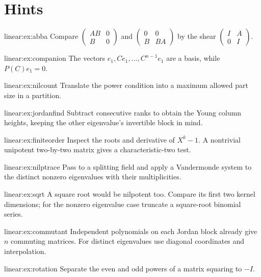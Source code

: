 \section{Hints}
\begin{hint}{linear:ex:abba}
Compare $\begin{pmatrix}AB&0\\B&0\end{pmatrix}$ and $\begin{pmatrix}0&0\\B&BA\end{pmatrix}$ by the shear $\begin{pmatrix}I&A\\0&I\end{pmatrix}$.
\end{hint}
\begin{hint}{linear:ex:companion}
The vectors $e_1,Ce_1,\ldots,C^{n-1}e_1$ are a basis, while $P(C)e_1=0$.
\end{hint}
\begin{hint}{linear:ex:nilcount}
Translate the power condition into a maximum allowed part size in a partition.
\end{hint}
\begin{hint}{linear:ex:jordanfind}
Subtract consecutive ranks to obtain the Young column heights, keeping the other eigenvalue's invertible block in mind.
\end{hint}
\begin{hint}{linear:ex:finiteorder}
Inspect the roots and derivative of $X^k-1$. A nontrivial unipotent two-by-two matrix gives a characteristic-two test.
\end{hint}
\begin{hint}{linear:ex:nilptrace}
Pass to a splitting field and apply a Vandermonde system to the distinct nonzero eigenvalues with their multiplicities.
\end{hint}
\begin{hint}{linear:ex:sqrt}
A square root would be nilpotent too. Compare its first two kernel dimensions; for the nonzero eigenvalue case truncate a square-root binomial series.
\end{hint}
\begin{hint}{linear:ex:commutant}
Independent polynomials on each Jordan block already give $n$ commuting matrices. For distinct eigenvalues use diagonal coordinates and interpolation.
\end{hint}
\begin{hint}{linear:ex:rotation}
Separate the even and odd powers of a matrix squaring to $-I$.
\end{hint}
